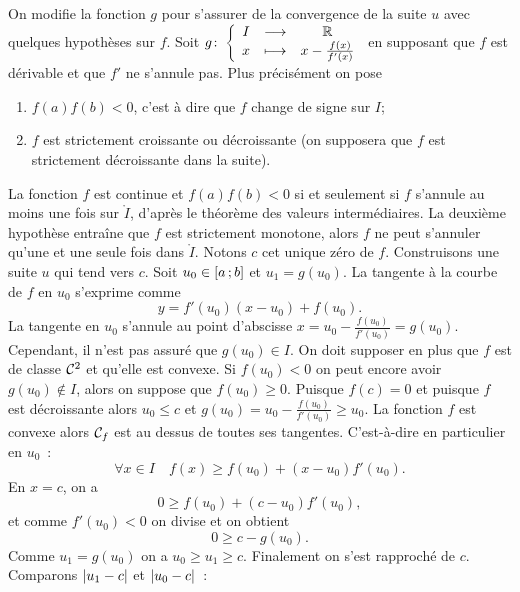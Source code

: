 On modifie la fonction \(g\) pour s'assurer de la convergence de la suite \(u\)
avec quelques hypothèses sur \(f\). Soit
\(g\colon\left\{\begin{array}{ccc}I & \longrightarrow &\mathbb{R}\\x & \longmapsto & x-\frac{f(x)}{f'(x)}\end{array}\right.\) en supposant que \(f\) est
dérivable et que \(f'\) ne s'annule pas. Plus précisément on pose
\begin{enumerate}
  \item \(f(a)f(b) <0\), c'est à dire que \(f\) change de signe sur \(I\);
  \item \(f\) est strictement croissante ou décroissante (on supposera que \(f\)
    est strictement décroissante dans la suite).
\end{enumerate}
La fonction \(f\) est continue et \(f(a)f(b) <0\) si et seulement si \(f\)
s'annule au moins une fois sur \(\mathring{I}\), d'après le théorème des valeurs
intermédiaires. La deuxième hypothèse entraîne que \(f\) est strictement
monotone, alors \(f\) ne peut s'annuler qu'une et une seule fois dans
\(\mathring{I}\). Notons \(c\) cet unique zéro de \(f\). Construisons une suite
\(u\) qui tend vers \(c\). Soit \(u_0 \in \left[ a \, ; {} b \right]\) et
\(u_1=g(u_0)\). La tangente à la courbe de \(f\) en \(u_0\) s'exprime comme
\begin{equation}
  y=f'(u_0)(x-u_0)+f(u_0).
\end{equation}
La tangente en \(u_0\) s'annule au point d'abscisse \(x=
u_0-\frac{f(u_0)}{f'(u_0)}=g(u_0)\). Cependant, il n'est pas assuré que \(g(u_0)
\in I\). On doit supposer en plus que \(f\) est de classe \(\mathcal{C}^{2}\) et
qu'elle est convexe. Si \(f(u_0) <0\) on peut encore avoir \(g(u_0) \notin I\),
alors on suppose que \(f(u_0) \geqslant 0\). Puisque \(f(c)=0\) et puisque \(f\)
est décroissante alors \(u_0 \leqslant c\) et \(g(u_0)=u_0 -
\frac{f(u_0)}{f'(u_0)} \geqslant u_0\). La fonction \(f\) est convexe alors
\(\mathcal{C}_f\) est au dessus de toutes ses tangentes. C'est-à-dire en particulier
en \(u_0\)~:
\begin{equation}
  \forall x \in I \quad f(x) \geqslant f(u_0)+(x-u_0)f'(u_0).
\end{equation}
En \(x=c\), on a
\begin{equation}
  0 \geqslant f(u_0)+(c-u_0)f'(u_0),
\end{equation}
et comme \(f'(u_0) < 0\) on divise et on obtient
\begin{equation}
  0 \geqslant c - g(u_0).
\end{equation}
Comme \(u_1=g(u_0)\) on a \(u_0 \geqslant u_1 \geqslant c\). Finalement on s'est
rapproché de \(c\). Comparons \(\left\lvert u_1-c\right\rvert\) et \(\left\lvert u_0-c\right\rvert\)~:
